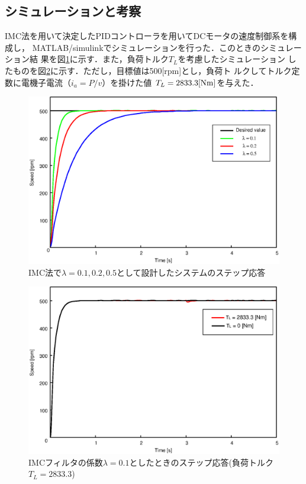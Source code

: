 \documentclass[a4paper,12pt]{jarticle}
\begin{document}
\subsection{シミュレーションと考察}
IMC法を用いて決定したPIDコントローラを用いてDCモータの速度制御系を構成し，
MATLAB/simulinkでシミュレーションを行った．このときのシミュレーション結
果を図\ref{fig:IMC_result}に示す．また，負荷トルク$T_L$を考慮したシミュレーション
したものを図\ref{fig:IMC_TL}に示す．ただし，目標値は500[rpm]とし，負荷ト
ルクしてトルク定数に電機子電流（$i_a = P/v$）を掛けた値
$T_L=2833.3[\rm{Nm}]$を与えた．
%
\begin{figure}[tbp]
 \begin{center}
  \includegraphics[width = 150mm]{fig/IMC_result.eps}
 \end{center}
 \caption{IMC法で$\lambda=0.1,0.2,0.5$として設計したシステムのステップ応答}
 \label{fig:IMC_result}
\end{figure}
%
%
\begin{figure}[tbp]
 \begin{center}
  \includegraphics[width = 150mm]{fig/IMC_TL.eps}
 \end{center}
 \caption{IMCフィルタの係数$\lambda=0.1$としたときのステップ応答(負荷トルク$T_L=2833.3$)}
 \label{fig:IMC_TL}
\end{figure}
\end{document}
